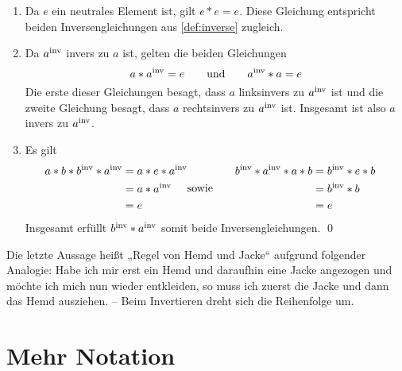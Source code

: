 \begin{bew}
    \begin{enumerate}
        \item Da $e$ ein neutrales Element ist, gilt $e*e=e$. Diese Gleichung entspricht beiden Inversengleichungen aus \cref{def:inverse} zugleich.
        \item Da $a^{\mathrm{inv}}$ invers zu $a$ ist, gelten die beiden Gleichungen
            \[ a*a^{\mathrm{inv}} = e \qquad\text{und}\qquad a^{\mathrm{inv}} * a=e \]
        Die erste dieser Gleichungen besagt, dass $a$ linksinvers zu $a^{\mathrm{inv}}$ ist und die zweite Gleichung besagt, dass $a$ rechtsinvers zu $a^{\mathrm{inv}}$ ist. Insgesamt ist also $a$ invers zu $a^{\mathrm{inv}}$.
        \item Es gilt
        \begin{align*}
            \begin{split}
                a*b* b^{\mathrm{inv}} *a^{\mathrm{inv}}  & =  a*e*a^{\mathrm{inv}} \\
                & = a*a^{\mathrm{inv}} \\
                & = e
            \end{split} & \text{sowie}\qquad \begin{split}
                b^{\mathrm{inv}} *a^{\mathrm{inv}} * a*b  & =  b^{\mathrm{inv}} * e* b \\
                & = b^{\mathrm{inv}} * b \\
                & = e
            \end{split}
        \end{align*}
        Insgesamt erfüllt $b^{\mathrm{inv}} *a^{\mathrm{inv}}$ somit beide Inversengleichungen. \qed
    \end{enumerate}
\end{bew}


\begin{bem} 
    Die letzte Aussage heißt „Regel von Hemd und Jacke“ aufgrund folgender Analogie: Habe ich mir erst ein Hemd und daraufhin eine Jacke angezogen und möchte ich mich nun wieder entkleiden, so muss ich zuerst die Jacke und dann das Hemd ausziehen. -- Beim Invertieren dreht sich die Reihenfolge um.
\end{bem}





\section{Mehr Notation}


